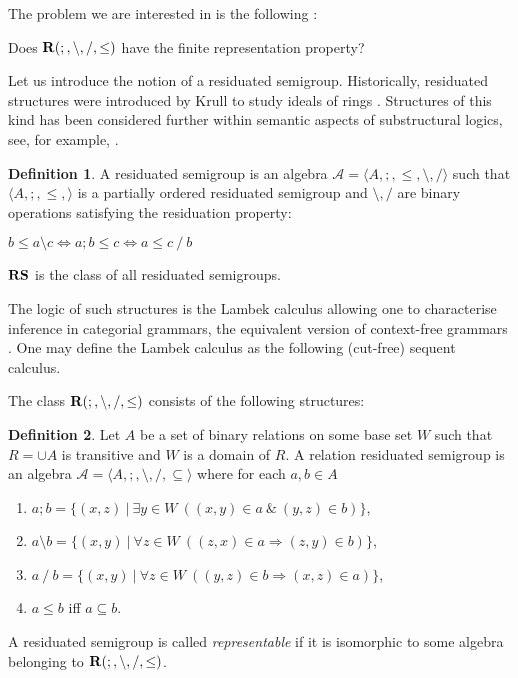 \documentclass[a4paper]{article}
\theoremstyle{definition}
\newtheorem{definition}{Definition}
\theoremstyle{theorem}
\theoremstyle{proposition}
\theoremstyle{lemma}
\theoremstyle{ex}
\theoremstyle{corollary}
\theoremstyle{claim}
\begin{document}
The problem we are interested in is the following \cite[Problem 19.17]{hirsch2002relation}:

\begin{center}
  Does ${\bf R}(;, \setminus, /, \leq)$ have the finite representation property?
\end{center}

Let us introduce the notion of a residuated semigroup. Historically, residuated structures were introduced by Krull to study ideals of rings \cite{krull1968idealtheorie}. Structures of this kind has been considered further within semantic aspects of substructural logics, see, for example, \cite{jipsen2002survey}.

\begin{definition}
  A residuated semigroup is an algebra $\mathcal{A} = \langle A, ;, \leq, \setminus, / \rangle$ such that $\langle A, ;, \leq, \rangle$ is a partially ordered residuated semigroup and $\setminus, /$ are binary operations satisfying the residuation property:

  \begin{center}
    $b \leq a \setminus c \Leftrightarrow a ; b \leq c \Leftrightarrow a \leq c \: / \: b$
  \end{center}
  ${\bf RS}$ is the class of all residuated semigroups.
\end{definition}

The logic of such structures is the Lambek calculus \cite{lambek1958mathematics} allowing one to characterise inference in categorial grammars, the equivalent version of context-free grammars \cite{pentus1993lambek}. One may define the Lambek calculus as the following (cut-free) sequent calculus.

The class ${\bf R}(;, \setminus, /, \leq)$ consists of the following structures:

\begin{definition} \label{rrs}
  Let $A$ be a set of binary relations on some base set $W$ such that $R = \cup A$ is transitive and $W$ is a domain of $R$. A relation residuated semigroup is an algebra $\mathcal{A} = \langle A, ;, \setminus, /, \subseteq \rangle$ where for each $a, b \in A$
  \begin{enumerate}
    \item $a ; b = \{ (x, z) \: | \: \exists y \in W \: ((x, y) \in a \: \& \: (y, z) \in b) \}$,
    \item $a \setminus b = \{ (x, y) \: | \: \forall z \in W \: ((z, x) \in a \Rightarrow (z, y) \in b)\}$,
    \item $a \: / \: b = \{ (x, y) \: | \: \forall z \in W \: ((y, z) \in b \Rightarrow (x, z) \in a)\}$,
    \item $a \leq b$ iff $a \subseteq b$.
  \end{enumerate}
\end{definition}
A residuated semigroup is called \emph{representable} if it is isomorphic to some algebra belonging to ${\bf R}(;, \setminus, /, \leq)$.
\end{document}

